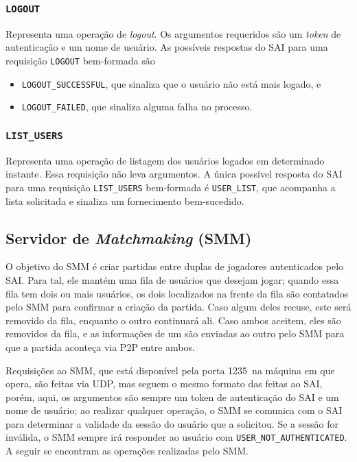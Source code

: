 \documentclass{article}
\newcommand{\mmsPort}{1235}
\begin{document}
\begin{multicols}{2}
    \subsubsection{\texttt{LOGOUT}}
    
    Representa uma operação de \textit{logout}. Os argumentos requeridos são um \textit{token} de autenticação e um nome de usuário. As possíveis respostas do SAI para uma requisição \texttt{LOGOUT} bem-formada são
    
    \begin{itemize}
      \item \texttt{LOGOUT\_SUCCESSFUL}, que sinaliza que o usuário não está mais logado, e
      \item \texttt{LOGOUT\_FAILED}, que sinaliza alguma falha no processo.
    \end{itemize}
    
    \subsubsection{\texttt{LIST\_USERS}}
    
    Representa uma operação de listagem dos usuários logados em determinado instante. Essa requisição não leva argumentos. A única possível resposta do SAI para uma requisição \texttt{LIST\_USERS} bem-formada é \texttt{USER\_LIST}, que acompanha a lista solicitada e sinaliza um fornecimento bem-sucedido.
    
    \subsection{Servidor de \textit{Matchmaking} (SMM)}
    
    O objetivo do SMM é criar partidas entre duplas de jogadores autenticados pelo SAI. Para tal, ele mantém uma fila de usuários que desejam jogar; quando essa fila tem dois ou mais usuários, os dois localizados na frente da fila são contatados pelo SMM para confirmar a criação da partida. Caso algum deles recuse, este será removido da fila, enquanto o outro continuará ali. Caso ambos aceitem, eles são removidos da fila, e as informações de um são enviadas ao outro pelo SMM para que a partida aconteça via P2P entre ambos.
    
    Requisições ao SMM, que está disponível pela porta \mmsPort\ na máquina em que opera, são feitas via UDP, mas seguem o mesmo formato das feitas ao SAI, porém, aqui, os argumentos são sempre um token de autenticação do SAI e um nome de usuário; ao realizar qualquer operação, o SMM se comunica com o SAI para determinar a validade da sessão do usuário que a solicitou. Se a sessão for inválida, o SMM sempre irá responder ao usuário com \texttt{USER\_NOT\_AUTHENTICATED}. A seguir se encontram as operações realizadas pelo SMM.
    

\end{multicols}
\end{document}
